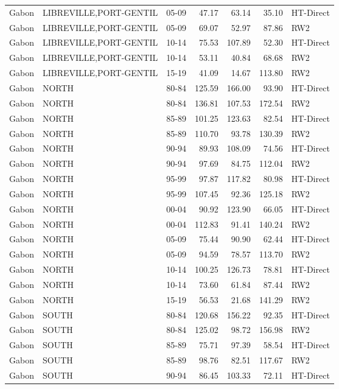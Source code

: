 \begin{longtable}{lllrrrl}
  Gabon & LIBREVILLE,PORT-GENTIL & 05-09 & 47.17 & 63.14 & 35.10 & HT-Direct \\ 
  Gabon & LIBREVILLE,PORT-GENTIL & 05-09 & 69.07 & 52.97 & 87.86 & RW2 \\ 
  Gabon & LIBREVILLE,PORT-GENTIL & 10-14 & 75.53 & 107.89 & 52.30 & HT-Direct \\ 
  Gabon & LIBREVILLE,PORT-GENTIL & 10-14 & 53.11 & 40.84 & 68.68 & RW2 \\ 
  Gabon & LIBREVILLE,PORT-GENTIL & 15-19 & 41.09 & 14.67 & 113.80 & RW2 \\ 
  Gabon & NORTH & 80-84 & 125.59 & 166.00 & 93.90 & HT-Direct \\ 
  Gabon & NORTH & 80-84 & 136.81 & 107.53 & 172.54 & RW2 \\ 
  Gabon & NORTH & 85-89 & 101.25 & 123.63 & 82.54 & HT-Direct \\ 
  Gabon & NORTH & 85-89 & 110.70 & 93.78 & 130.39 & RW2 \\ 
  Gabon & NORTH & 90-94 & 89.93 & 108.09 & 74.56 & HT-Direct \\ 
  Gabon & NORTH & 90-94 & 97.69 & 84.75 & 112.04 & RW2 \\ 
  Gabon & NORTH & 95-99 & 97.87 & 117.82 & 80.98 & HT-Direct \\ 
  Gabon & NORTH & 95-99 & 107.45 & 92.36 & 125.18 & RW2 \\ 
  Gabon & NORTH & 00-04 & 90.92 & 123.90 & 66.05 & HT-Direct \\ 
  Gabon & NORTH & 00-04 & 112.83 & 91.41 & 140.24 & RW2 \\ 
  Gabon & NORTH & 05-09 & 75.44 & 90.90 & 62.44 & HT-Direct \\ 
  Gabon & NORTH & 05-09 & 94.59 & 78.57 & 113.70 & RW2 \\ 
  Gabon & NORTH & 10-14 & 100.25 & 126.73 & 78.81 & HT-Direct \\ 
  Gabon & NORTH & 10-14 & 73.60 & 61.84 & 87.44 & RW2 \\ 
  Gabon & NORTH & 15-19 & 56.53 & 21.68 & 141.29 & RW2 \\ 
  Gabon & SOUTH & 80-84 & 120.68 & 156.22 & 92.35 & HT-Direct \\ 
  Gabon & SOUTH & 80-84 & 125.02 & 98.72 & 156.98 & RW2 \\ 
  Gabon & SOUTH & 85-89 & 75.71 & 97.39 & 58.54 & HT-Direct \\ 
  Gabon & SOUTH & 85-89 & 98.76 & 82.51 & 117.67 & RW2 \\ 
  Gabon & SOUTH & 90-94 & 86.45 & 103.33 & 72.11 & HT-Direct \\ 

\end{longtable}
